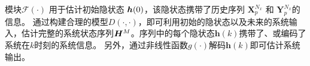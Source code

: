 模块$\mathcal{F}(\cdot)$ 用于估计初始隐状态 $\boldsymbol h(0)$，该隐状态携带了历史序列 $\boldsymbol X_p^{N_x} \text{ 和 } \boldsymbol Y_p^{N_x}$的信息。
通过构建合理的模型$D(\cdot, \cdot)$，即可利用初始的隐状态以及未来的系统输入，估计完整的系统状态序列$\boldsymbol H^M$。序列中的每个隐状态$\boldsymbol h(k)$携带了、或编码了系统在$k$时刻的系统信息。
另外，通过非线性函数$g(\cdot)$解码$\boldsymbol h(k)$即可估计系统输出。


